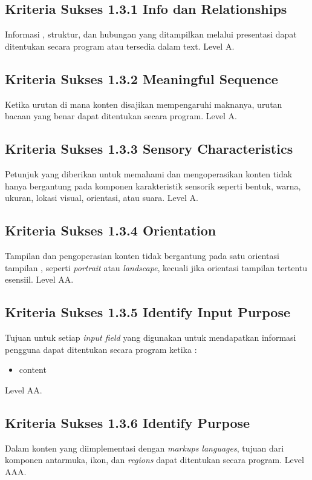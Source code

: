 \subsection{Kriteria Sukses 1.3.1 Info dan Relationships}
\label{sec:kriteria_1.3.1}
Informasi , struktur, dan hubungan yang ditampilkan melalui presentasi dapat ditentukan secara program atau tersedia dalam text.
Level A.

\subsection{Kriteria Sukses 1.3.2 Meaningful Sequence}
\label{sec:kriteria_1.3.2}
Ketika urutan di mana konten disajikan mempengaruhi maknanya, urutan bacaan yang benar dapat ditentukan secara program.
Level A.

\subsection{Kriteria Sukses 1.3.3 Sensory Characteristics}
\label{sec:kriteria_1.3.3}
Petunjuk yang diberikan untuk memahami dan mengoperasikan konten tidak hanya bergantung pada komponen karakteristik sensorik seperti bentuk, warna, ukuran, lokasi visual, orientasi, atau suara.
Level A.

\subsection{Kriteria Sukses 1.3.4 Orientation}
\label{sec:kriteria_1.3.4}
Tampilan dan pengoperasian konten tidak bergantung pada satu orientasi tampilan , seperti \textit{portrait} atau \textit{landscape}, kecuali jika orientasi tampilan tertentu esensiil.
Level AA.

\subsection{Kriteria Sukses 1.3.5 Identify Input Purpose}
\label{sec:kriteria_1.3.5}
Tujuan untuk setiap \textit{input field} yang digunakan untuk mendapatkan informasi pengguna dapat ditentukan secara program ketika :
\begin{itemize}
	\item content
\end{itemize}
Level AA.

\subsection{Kriteria Sukses 1.3.6 Identify Purpose}
\label{sec:kriteria_1.3.6}
Dalam konten yang diimplementasi dengan \textit{markups languages}, tujuan dari komponen antarmuka, ikon, dan \textit{regions} dapat ditentukan secara program.
Level AAA.


